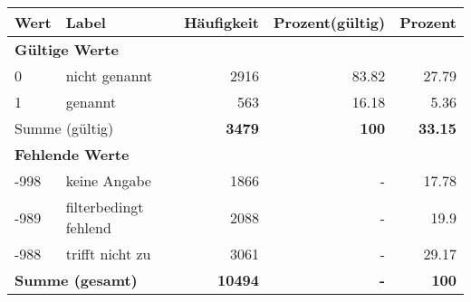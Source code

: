      \begin{longtable}{lXrrr}
     \toprule
     \textbf{Wert} & \textbf{Label} & \textbf{Häufigkeit} & \textbf{Prozent(gültig)} & \textbf{Prozent} \\
     \endhead
     \midrule
     \multicolumn{5}{l}{\textbf{Gültige Werte}}\\

     0 &
     \multicolumn{1}{X}{ nicht genannt   } &


       \num{2916} &
       \num[round-mode=places,round-precision=2]{83,82} &
         \num[round-mode=places,round-precision=2]{27,79} \\

     1 &
     \multicolumn{1}{X}{ genannt   } &


       \num{563} &
       \num[round-mode=places,round-precision=2]{16,18} &
         \num[round-mode=places,round-precision=2]{5,36} \\
     \midrule
     \multicolumn{2}{l}{Summe (gültig)} &
       \textbf{\num{3479}} &
     \textbf{100} &
       \textbf{\num[round-mode=places,round-precision=2]{33,15}} \\
     \multicolumn{5}{l}{\textbf{Fehlende Werte}}\\
       -998 &
       keine Angabe &
         \num{1866} &
        - &
         \num[round-mode=places,round-precision=2]{17,78} \\
       -989 &
       filterbedingt fehlend &
         \num{2088} &
        - &
         \num[round-mode=places,round-precision=2]{19,9} \\
       -988 &
       trifft nicht zu &
         \num{3061} &
        - &
         \num[round-mode=places,round-precision=2]{29,17} \\
     \midrule
     \multicolumn{2}{l}{\textbf{Summe (gesamt)}} &
          \textbf{\num{10494}} &
        \textbf{-} &
        \textbf{100} \\
     \bottomrule
     \end{longtable}
     
